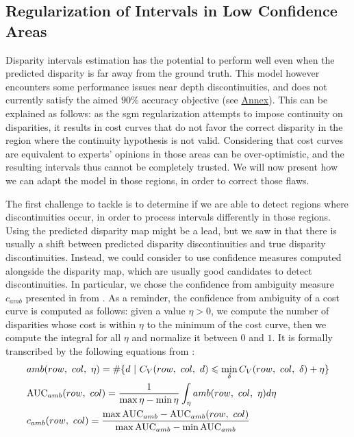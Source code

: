 \subsection{Regularization of Intervals in Low Confidence Areas}\label{sec:regularization_of_intervals}
Disparity intervals estimation has the potential to perform well even when the predicted disparity is far away from the ground truth. This model however encounters some performance issues near depth discontinuities, and does not currently satisfy the aimed $90\%$ accuracy objective (see \hyperref[chap:annex]{Annex}). This can be explained as follows: as the \acrshort{sgm} regularization attempts to impose continuity on disparities, it results in cost curves that do not favor the correct disparity in the region where the continuity hypothesis is not valid. Considering that cost curves are equivalent to experts' opinions in those areas can be over-optimistic, and the resulting intervals thus cannot be completely trusted. We will now present how we can adapt the model in those regions, in order to correct those flaws.

The first challenge to tackle is to determine if we are able to detect regions where discontinuities occur, in order to process intervals differently in those regions. Using the predicted disparity map might be a lead, but we saw in  that there is usually a shift between predicted disparity discontinuities and true disparity discontinuities. Instead, we could consider to use confidence measures computed alongside the disparity map, which are usually good candidates to detect discontinuities. In particular, we chose the confidence from ambiguity measure $c_{amb}$ presented in  from . As a reminder, the confidence from ambiguity of a cost curve is computed as follows: given a value $\eta>0$, we compute the number of disparities whose cost is within $\eta$ to the minimum of the cost curve, then we compute the integral for all $\eta$ and normalize it between $0$ and $1$. It is formally transcribed by the following equations from :
\begin{align*}
    &amb(row, ~col, ~\eta) = \#\{d ~|~ C_V(row,~col,~d) \leqslant \min_\delta C_V(row, ~col, ~\delta) + \eta\}\\
    &\mathrm{AUC}_{amb}(row, ~col) = \frac{1}{\max\eta-\min\eta}\int_\eta amb(row,~col,~\eta)d\eta\\
    &c_{amb}(row, ~col) = \frac{\max \mathrm{AUC}_{amb}- \mathrm{AUC}_{amb}(row, ~col)}{\max \mathrm{AUC}_{amb} -\min \mathrm{AUC}_{amb}}
\end{align*}

